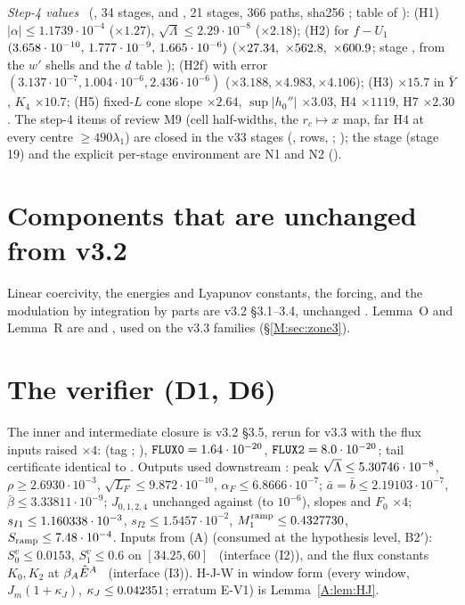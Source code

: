 \documentclass[11pt]{article}
\begin{document}
\noindent\emph{Step-4 values} \tC\ (, 34 stages, and , 21 stages, 366 paths, sha256 ; table of ): (H1) $|\alpha|\le1.1739\cdot10^{-4}$ ($\times1.27$), $\sqrt\Lambda\le2.29\cdot10^{-8}$ ($\times2.18$); (H2) for $f-U_1$ $(3.658\cdot10^{-10},\,1.777\cdot10^{-9},\,1.665\cdot10^{-6})$ ($\times27.34,\ \times562.8,\ \times600.9$; stage , from the $w'$ shells and the $d$ table ); (H2f) with error $(3.137\cdot10^{-7},1.004\cdot10^{-6},2.436\cdot10^{-6})$ ($\times3.188,\times4.983,\times4.106$); (H3) $\times15.7$ in $\bar Y$, $K_4$ $\times10.7$; (H5) fixed-$L$ cone slope $\times2.64$, $\sup|h_0''|$ $\times3.03$, H4 $\times1119$, H7 $\times2.30$. The step-4 items of review M9 (cell half-widths, the $r_c\mapsto x$ map, far H4 at every centre $\ge490\lambda_1$) are closed in the v33 stages (,  rows, ; ); the stage  (stage 19) and the explicit per-stage environment are N1 and N2 ().

\section{Components that are unchanged from v3.2}\label{M:sec:unchanged}
Linear coercivity, the energies and Lyapunov constants, the forcing, and the modulation by integration by parts are v3.2 \S3.1--3.4, unchanged \tC. Lemma~O and Lemma~R are  and , used on the v3.3 families (\S\ref{M:sec:zone3}).

\section{The verifier (D1, D6)}\label{M:sec:verifier}
The inner and intermediate closure is v3.2 \S3.5, rerun for v3.3 with the flux inputs raised $\times4$:  (tag ; ), $\fn{FLUX0}=1.64\cdot10^{-20}$, $\fn{FLUX2}=8.0\cdot10^{-20}$; tail certificate identical to . Outputs used downstream \tC: peak $\sqrt\Lambda\le5.30746\cdot10^{-8}$, $\rho\ge2.6930\cdot10^{-3}$, $\sqrt{L_F}\le9.872\cdot10^{-10}$, $\alpha_F\le6.8666\cdot10^{-7}$; $\bar a=\bar b\le2.19103\cdot10^{-7}$, $\bar\beta\le3.33811\cdot10^{-9}$; $J_{0,1,2,4}$ unchanged against  (to $10^{-6}$), slopes and $F_0$ $\times4$; $s_{I1}\le1.160338\cdot10^{-3}$, $s_{I2}\le1.5457\cdot10^{-2}$, $M_1^{\rm ramp}\le0.4327730$, $S_{\rm ramp}\le7.48\cdot10^{-4}$. Inputs from (A) (consumed at the hypothesis level, B2$'$): $S^v_0\le0.0153$, $S^v_1\le0.6$ on $[34.25,60]$ \tB\ (interface (I2)), and the flux constants $K_0,K_2$ at $\beta_A\hat E^A$ \tB\ (interface (I3)). H-J-W in window form (every window, $J_m(1+\kappa_J)$, $\kappa_J\le0.042351$; erratum E-V1) is Lemma~\ref{A:lem:HJ}.
\end{document}
